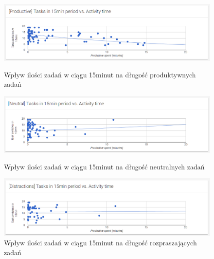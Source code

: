\documentclass[openright]{xmgr}
\begin{document}
    \begin{figure}
        \includegraphics[width=\linewidth]{fig/ui/chart-tasks-productive.png}
        \caption{Wpływ ilości zadań w ciągu 15minut na długość produktywnych zadań}
        \label{fig:ui:chart-tasks-productive}

        \includegraphics[width=\linewidth]{fig/ui/chart-tasks-neutral.png}
        \caption{Wpływ ilości zadań w ciągu 15minut na długość neutralnych zadań}
        \label{fig:ui:chart-tasks-neutral}

        \includegraphics[width=\linewidth]{fig/ui/chart-tasks-distractions.png}
        \caption{Wpływ ilości zadań w ciągu 15minut na długość rozpraszających zadań}
        \label{fig:ui:chart-tasks-distractions}
    \end{figure}
\end{document}
